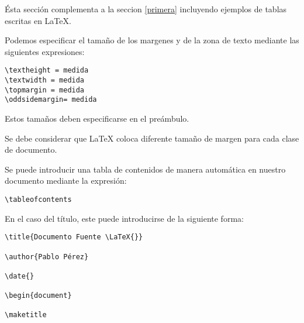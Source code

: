 \documentclass[letterpaper,11pt]{article}
\begin{document}
Ésta sección complementa a la seccion \ref{primera} incluyendo ejemplos de tablas escritas en \LaTeX.

Podemos especificar el tamaño de los margenes y de la zona de texto mediante las siguientes expresiones:

\begin{verbatim}
\textheight = medida
\textwidth = medida
\topmargin = medida
\oddsidemargin= medida
\end{verbatim}

Estos tamaños deben especificarse en el preámbulo.

Se debe considerar que \LaTeX{} coloca diferente tamaño de margen para cada clase de documento.


Se puede introducir una tabla de contenidos de manera automática en nuestro documento mediante la expresión:

\begin{verbatim}
\tableofcontents
\end{verbatim}

En el caso del título, este puede introducirse de la siguiente forma:

\begin{verbatim}
\title{Documento Fuente \LaTeX{}}

\author{Pablo Pérez}

\date{}

\begin{document}

\maketitle
\end{verbatim}
\end{document}
